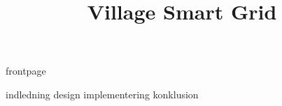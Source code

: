 \documentclass[a4paper]{article}								%
\title{Village Smart Grid}
\begin{document}

	{frontpage}

	\tableofcontents\thispagestyle{fancy} \newpage


	{indledning} \newpage
	{design} \newpage
	{implementering} \newpage
	{konklusion} \newpage


\end{document}
